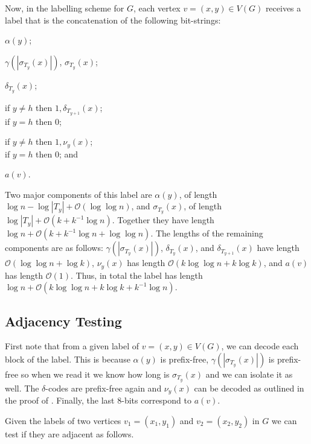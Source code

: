 \documentclass[kpfonts]{patmorin}
\newcommand{\Oh}{\mathcal{O}}
\begin{document}
Now, in the labelling scheme for $G$, each vertex $v=(x,y)\in V(G)$ receives a label that is the concatenation of the following bit-strings:
\begin{compactenum}[(P1)]
\item $\alpha(y)$;
\item $\gamma(|\sigma_{T_y}(x)|)$, $\sigma_{T_y}(x)$;
\item $\delta_{T_y}(x)$; 
\item 
if $y\neq h$ then $1,\delta_{T_{y+1}}(x)$;\\
if $y=h$ then $0$;
\item 
if $y\neq h$ then $1,\nu_y(x)$;\\
if $y=h$ then $0$; and
\item $a(v)$.
\end{compactenum}
Two major components of this label are $\alpha(y)$, of length $\log n - \log|T_y| + \Oh(\log\log n)$,
and $\sigma_{T_y}(x)$, of length $\log|T_y| + \Oh(k+k^{-1}\log n)$.
Together they have length $\log n + \Oh(k+k^{-1}\log n+\log\log n)$.
The lengths of the remaining components are as follows:
$\gamma(|\sigma_{T_y}(x)|)$,
$\delta_{T_y}(x)$, and $\delta_{T_{y+1}}(x)$
 have length $\Oh(\log\log n + \log k)$, $\nu_y(x)$ has length $\Oh(k\log\log n + k\log k)$, and $a(v)$ has length $\Oh(1)$.
Thus, in total the label has length  $\log n+ \Oh(k\log\log n + k\log k + k^{-1}\log n)$.

\subsection{Adjacency Testing}

First note that from a given label of $v=(x,y) \in V(G)$, we can decode each block of the label.
This is because $\alpha(y)$ is prefix-free, $\gamma(|\sigma_{T_y}(x)|)$ is prefix-free so when we read it we know how long is $\sigma_{T_y}(x)$ and we can isolate it as well.
The $\delta$-codes are prefix-free again and $\nu_y(x)$ can be decoded as outlined in the proof of .
Finally, the last $8$-bits correspond to $a(v)$.

Given the labels of two vertices $v_1=(x_1,y_1)$ and $v_2=(x_2,y_2)$ in $G$ we can test if they are adjacent as follows.
\end{document}

